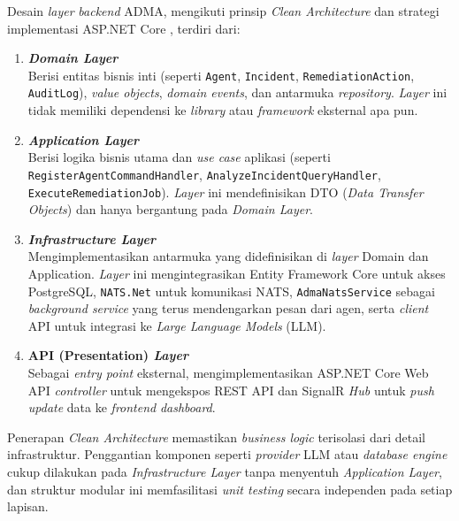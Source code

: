 Desain \textit{layer} \textit{backend} ADMA, mengikuti prinsip \textit{Clean Architecture} \cite{martin2017clean} dan strategi implementasi ASP.NET Core \cite{valiveti2025evolution}, terdiri dari:
\begin{enumerate}[label=\arabic*., leftmargin=*]
  \item \textbf{\textit{Domain Layer}}\\
        Berisi entitas bisnis inti (seperti \texttt{Agent}, \texttt{Incident}, \texttt{RemediationAction}, \texttt{AuditLog}), \textit{value objects}, \textit{domain events}, dan antarmuka \textit{repository}. \textit{Layer} ini tidak memiliki dependensi ke \textit{library} atau \textit{framework} eksternal apa pun.

  \item \textbf{\textit{Application Layer}}\\
        Berisi logika bisnis utama dan \textit{use case} aplikasi (seperti \texttt{RegisterAgentCommandHandler}, \texttt{AnalyzeIncidentQueryHandler}, \texttt{ExecuteRemediationJob}). \textit{Layer} ini mendefinisikan DTO (\textit{Data Transfer Objects}) dan hanya bergantung pada \textit{Domain Layer}.

  \item \textbf{\textit{Infrastructure Layer}}\\
        Mengimplementasikan antarmuka yang didefinisikan di \textit{layer} Domain dan Application. \textit{Layer} ini mengintegrasikan Entity Framework Core untuk akses PostgreSQL, \texttt{NATS.Net} untuk komunikasi NATS, \texttt{AdmaNatsService} sebagai \textit{background service} yang terus mendengarkan pesan dari agen, serta \textit{client} API untuk integrasi ke \textit{Large Language Models} (LLM).

  \item \textbf{API (Presentation) \textit{Layer}}\\
        Sebagai \textit{entry point} eksternal, mengimplementasikan ASP.NET Core Web API \textit{controller} untuk mengekspos REST API dan SignalR \textit{Hub} untuk \textit{push update} data ke \textit{frontend} \textit{dashboard}.
\end{enumerate}

Penerapan \textit{Clean Architecture} memastikan \textit{business logic} terisolasi dari detail infrastruktur. Penggantian komponen seperti \textit{provider} LLM atau \textit{database engine} cukup dilakukan pada \textit{Infrastructure Layer} tanpa menyentuh \textit{Application Layer}, dan struktur modular ini memfasilitasi \textit{unit testing} secara independen pada setiap lapisan.


